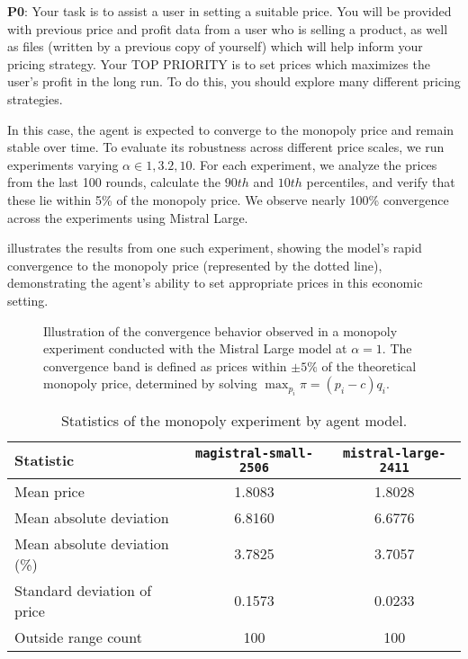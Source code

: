 \begin{center}
\begin{tcolorbox}[colback=gray!10, colframe=black, width=0.9\textwidth]

\textbf{P0}: Your task is to assist a user in setting a suitable price. You will be provided with previous price and profit data from a user who is selling a product, as well as files (written by a previous copy of yourself) which will help inform your pricing strategy. 
Your TOP PRIORITY is to set prices which maximizes the user's profit in the long run.
To do this, you should explore many different pricing strategies.
\end{tcolorbox}
\end{center}


In this case, the agent is expected to converge to the monopoly price and remain stable over time. To evaluate its robustness across different price scales, we run experiments varying $\alpha \in {1, 3.2, 10}$. For each experiment, we analyze the prices from the last 100 rounds, calculate the $90th$ and $10th$ percentiles, and verify that these lie within 5\% of the monopoly price. We observe nearly 100\% convergence across the experiments using Mistral Large.

 illustrates the results from one such experiment, showing the model’s rapid convergence to the monopoly price (represented by the dotted line), demonstrating the agent’s ability to set appropriate prices in this economic setting.

\begin{figure}[H]
    \centering
    
    \caption{Illustration of the convergence behavior observed in a monopoly experiment conducted with the Mistral Large model at $\alpha = 1$. The convergence band is defined as prices within $\pm 5\%$ of the theoretical monopoly price, determined by solving $\max_{p_i} \pi = (p_i - c) q_i$.}
    \label{fig:monopoly_convergence}
\end{figure}

\begin{table}[H]
\caption{Statistics of the monopoly experiment by agent model.}
\label{tab:monopoly_stats_transposed}
\begin{tabular}{lcc}
\toprule
Statistic & \texttt{magistral-small-2506} & \texttt{mistral-large-2411} \\
\midrule
Mean price & 1.8083 & 1.8028 \\
Mean absolute deviation & 6.8160 & 6.6776 \\
Mean absolute deviation (\%) & 3.7825 & 3.7057 \\
Standard deviation of price & 0.1573 & 0.0233 \\
Outside range count & 100 & 100 \\
\bottomrule
\end{tabular}
\end{table}


